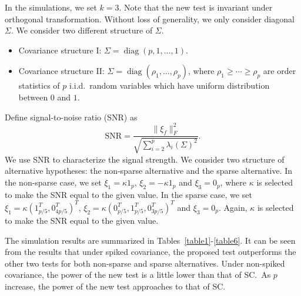 \documentclass[12pt]{article} %
\DeclareMathOperator{\mytr}{tr}
\DeclareMathOperator{\mydiag}{diag}
\theoremstyle{definition}
\begin{document}
In the simulations, we set $k=3$.
Note that the new test is invariant under orthogonal transformation.
Without loss of generality, we only consider diagonal $\Sigma$.
We consider two different structure of $\Sigma$.
\begin{itemize}
    \item
        Covariance structure I: $\Sigma=\mydiag(p,1,\ldots,1)$.
    \item
        Covariance structure II: $\Sigma=\mydiag(\rho_1,\ldots,\rho_p)$, where $\rho_1\geq \cdots\geq \rho_p$ are order statistics of $p$ i.i.d.\ random variables which have uniform distribution between $0$ and $1$.
\end{itemize}

Define signal-to-noise ratio (SNR) as
$$
\textrm{SNR}=\frac{\|\xi_f\|_F^2}{\sqrt{\sum_{i=2}^{p}\lambda_i(\Sigma)^2}}.
$$
We use SNR to characterize the signal strength.
We consider two structure of alternative hypotheses: the non-sparse alternative and the sparse alternative.
In the non-sparse case, we set $\xi_1=\kappa 1_p$, $\xi_2=-\kappa 1_p$ and $\xi_3=0_p$, where $\kappa$ is selected to make the SNR equal to the given value.
In the sparse case, we set $\xi_1=\kappa (1_{p/5}^T,0_{4p/5}^T)^T$, $\xi_2=\kappa (0_{p/5}^T, 1_{p/5}^T,0_{3p/5}^T)^T$ and $\xi_3=0_p$. Again, $\kappa$ is selected to make the SNR equal to the given value.

The simulation results are summarized in Tables~\ref{table1}-\ref{table6}. It can be seen from the results that under spiked covariance, the proposed test outperforms the other two tests for both non-sparse and sparse alternatives.
Under non-spiked covariance, the power of the new test is a little lower than that of SC.\ 
As $p$ increase, the power of the new test approaches to that of SC.

\end{document}
